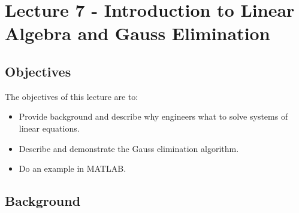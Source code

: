 \chapter{Lecture 7 - Introduction to Linear Algebra and Gauss Elimination}
\label{ch:lec7n}
\section{Objectives}
The objectives of this lecture are to:
\begin{itemize}
\item Provide background and describe why engineers what to solve systems of linear equations.
\item Describe and demonstrate the Gauss elimination algorithm.
\item Do an example in MATLAB.
\end{itemize}
\setcounter{lstannotation}{0}

\section{Background}

